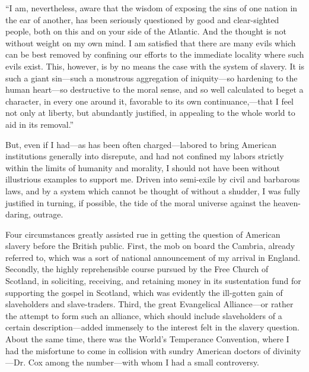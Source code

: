 {``I am, nevertheless, aware that the wisdom of exposing the sins of one
nation in the ear of another, has been seriously questioned by good and
clear-sighted people, both on this and on your side of the Atlantic. And
the thought is not without weight on my own mind. I am satisfied that
there are many evils which can be best removed by confining our efforts
to the immediate locality where such evils exist. This, however, is by
no means the case with the system of slavery. It is such a giant
sin---such a monstrous aggregation of iniquity---so hardening to the
human heart---so destructive to the moral sense, and so well calculated
to beget a character, in every one around it, favorable to its own
continuance,---that I feel not only at liberty, but abundantly
justified, in appealing to the whole world to aid in its removal.''}

But, even if I had---as has been often charged---labored to bring
American institutions generally into disrepute, and had not confined my
labors strictly within the limits of humanity and morality, I should not
have been without illustrious examples to support me. Driven into
semi-exile by civil and barbarous laws, and by a system which cannot be
thought of without a shudder, I was fully justified in turning, if
possible, the tide of the moral universe against the heaven-daring,
outrage.

{}Four circumstances greatly assisted rue in getting the question of
American slavery before the British public. First, the mob on board the
Cambria, already referred to, which was a sort of national announcement
of my arrival in England. Secondly, the highly reprehensible course
pursued by the Free Church of Scotland, in soliciting, receiving, and
retaining money in its sustentation fund for supporting the gospel in
Scotland, which was evidently the ill-gotten gain of slaveholders and
slave-traders. Third, the great Evangelical Alliance---or rather the
attempt to form such an alliance, which should include slaveholders of a
certain description---added immensely to the interest felt in the
slavery question. About the same time, there was the World's Temperance
Convention, where I had the misfortune to come in collision with sundry
American doctors of divinity---Dr. Cox among the number---with whom I
had a small controversy.


